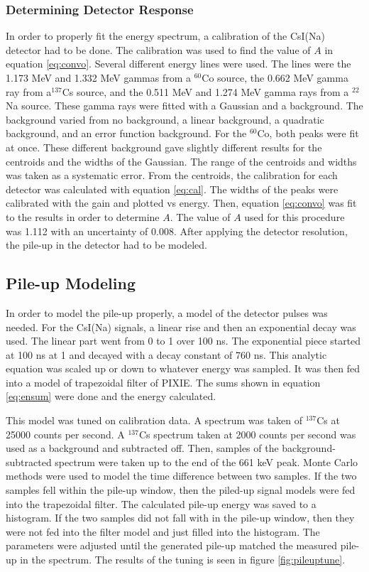 \documentclass[../MaxHughesThesis.tex]{subfiles}
\begin{document}
\subsubsection{Determining Detector Response}
In order to properly fit the energy spectrum, a calibration of the CsI(Na) detector had to be done.
The calibration was used to find the value of $A$ in equation \ref{eq:convo}.
Several different energy lines were used.
The lines were the 1.173 MeV and 1.332 MeV gammas from a $^{60}$Co source, the 0.662 MeV gamma ray from a$^{137}$Cs source, and the 0.511 MeV and 1.274 MeV gamma rays from a $^{22}$Na source.
These gamma rays were fitted with a Gaussian and a background.
The background varied from no background, a linear background, a quadratic background, and an error function background.
For the $^{60}$Co, both peaks were fit at once.
These different background gave slightly different results for the centroids and the widths of the Gaussian.
The range of the centroids and widths was taken as a systematic error.
From the centroids, the calibration for each detector was calculated with equation \ref{eq:cal}. 
The widths of the peaks were calibrated with the gain and plotted vs energy.
Then, equation \ref{eq:convo} was fit to the results in order to determine $A$.
The value of $A$ used for this procedure was 1.112 with an uncertainty of 0.008.
After applying the detector resolution, the pile-up in the detector had to be modeled.

\subsection{Pile-up Modeling}
In order to model the pile-up properly, a model of the detector pulses was needed. 
For the CsI(Na) signals, a linear rise and then an exponential decay was used.
The linear part went from 0 to 1 over 100 ns. 
The exponential piece started at 100 ns at 1 and decayed with a decay constant of 760 ns.
This analytic equation was scaled up or down to whatever energy was sampled.
It was then fed into a model of trapezoidal filter of PIXIE. 
The sums shown in equation \ref{eq:ensum} were done and the energy calculated.

This model was tuned on calibration data. 
A spectrum was taken of $^{137}$Cs at 25000 counts per second.
A  $^{137}$Cs spectrum taken at 2000 counts per second was used as a background and subtracted off.
Then, samples of the background-subtracted spectrum were taken up to the end of the 661 keV peak.
Monte Carlo methods were used to model the time difference between two samples.
If the two samples fell within the pile-up window, then the piled-up signal models were fed into the trapezoidal filter.
The calculated pile-up energy was saved to a histogram.
If the two samples did not fall with in the pile-up window, then they were not fed into the filter model and just filled into the histogram.
The parameters were adjusted until the generated pile-up matched the measured pile-up in the spectrum.
The results of the tuning is seen in figure \ref{fig:pileuptune}.
\end{document}
